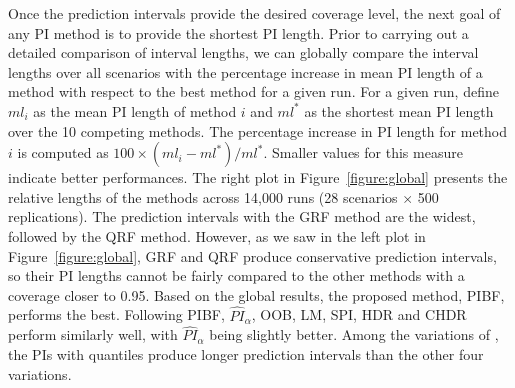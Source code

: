 Once the prediction intervals provide the desired coverage level, the next goal of any PI method is to provide the shortest PI length. Prior to carrying out a detailed comparison of interval lengths, we can globally compare the interval lengths over all scenarios with the percentage increase in mean PI length of a method with respect to the best method for a given run. For a given run, define $ml_{i}$ as the mean PI length of method $i$ and $ml^{*}$ as the shortest mean PI length over the 10 competing methods. The percentage increase in PI length for method $i$ is computed as $100 \times \left(ml_i - ml^{*}\right)/ml^{*}$. Smaller values for this measure indicate better performances. The right plot in Figure~\ref{figure:global} presents the relative lengths of the methods across 14,000 runs (28 scenarios $\times$ 500 replications). The prediction intervals with the GRF method are the widest, followed by the QRF method. However, as we saw in the left plot in Figure~\ref{figure:global}, GRF and QRF produce conservative prediction intervals, so their PI lengths cannot be fairly compared to the other methods with a coverage closer to 0.95. Based on the global results, the proposed method, PIBF, performs the best. Following PIBF, $\widehat{PI}_\alpha$, OOB, LM, SPI, HDR and CHDR perform similarly well, with $\widehat{PI}_\alpha$ being slightly better. Among the variations of \citet{roy_prediction_2020}, the PIs with quantiles produce longer prediction intervals than the other four variations. 

